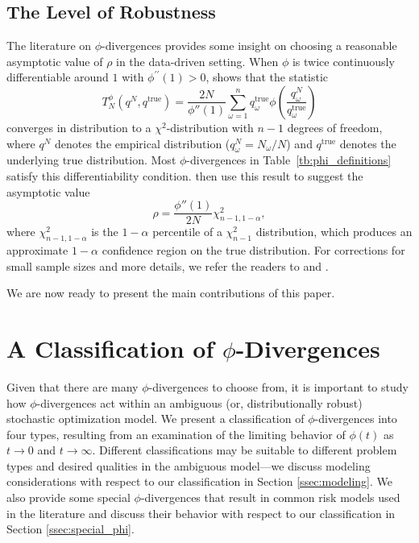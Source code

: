 \documentclass[12pt]{article}
\newcommand{\qtrue}{q^{\text{true}}}
\theoremstyle{plain}
\theoremstyle{definition}
\theoremstyle{remark}
\begin{document}
\subsection{The Level of Robustness}
\label{ssec:robust_level}

The literature on $\phi$-divergences provides some insight on choosing a reasonable asymptotic value of $\rho$ in the data-driven setting. 
When $\phi$ is twice continuously differentiable around $1$ with $\phi^{\prime \prime}(1)>0$, \citep[Theorem 3.1]{pardo2005statistical} shows that the statistic
\[
	T^\phi_N(q^N,\qtrue) = \frac{2N}{\phi''(1)} \sum_{\omega=1}^n \qtrue_\omega \phi\left(\frac{q^N_\omega}{\qtrue_\omega}\right)
\]
converges in distribution to a $\chi^2$-distribution with $n-1$ degrees of freedom, where $q^N$ denotes the empirical distribution ($q^N_\omega = N_\omega/N$) and $\qtrue$ denotes the underlying true distribution.
Most $\phi$-divergences in Table~\ref{tb:phi_definitions} satisfy this differentiability condition.
\citet{bental2011robust} then use this result to suggest the asymptotic value
\begin{equation} \label{eq:asymptotic_rho}
	\rho = \frac{\phi''(1)}{2N} \chi^2_{n-1,1-\alpha},
\end{equation}
where $\chi^2_{n-1,1-\alpha}$ is the $1-\alpha$ percentile of a $\chi^2_{n-1}$ distribution, which produces an approximate $1-\alpha$ confidence region on the true distribution.
For corrections for small sample sizes and more details, we refer the readers to \citep{pardo2005statistical} and \citep{bental2011robust}. 

We are now ready to present the main contributions of this paper. 

\section{A Classification of $\phi$-Divergences}
\label{sec:classification}

Given that there are many $\phi$-divergences to choose from, it is important to study how $\phi$-divergences act within an ambiguous (or, distributionally robust) stochastic optimization model. 
We present a classification of $\phi$-divergences into four types, resulting from an examination of the limiting behavior of $\phi(t)$ as $t \rightarrow 0$ and $t \rightarrow \infty$.
Different classifications may be suitable to different problem types and desired qualities in the ambiguous model---we discuss modeling considerations with respect to our classification in Section \ref{ssec:modeling}.
We also provide some special $\phi$-divergences that result in common risk models used in the literature and discuss their behavior with respect to our classification in Section \ref{ssec:special_phi}.
\end{document}
